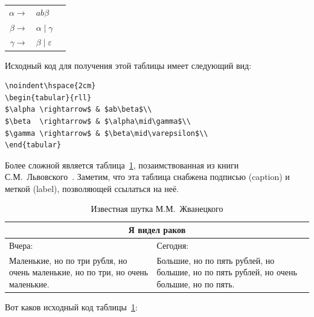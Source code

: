 \medskip
\noindent\hspace{2cm}
\begin{tabular}{rll}
$\alpha \rightarrow$ & $ab\beta$\\
$\beta  \rightarrow$ & $\alpha\mid\gamma$\\
$\gamma \rightarrow$ & $\beta\mid\varepsilon$\\
\end{tabular}
\medskip

\noindent Исходный код для получения этой таблицы имеет следующий вид:

\begin{small}
\begin{verbatim}
\noindent\hspace{2cm}
\begin{tabular}{rll}
$\alpha \rightarrow$ & $ab\beta$\\
$\beta  \rightarrow$ & $\alpha\mid\gamma$\\
$\gamma \rightarrow$ & $\beta\mid\varepsilon$\\
\end{tabular}
\end{verbatim}
\end{small}

Более сложной является таблица~\ref{tabl:crayfish}, позаимствованная из книги
С.\+М.~Львовского~\cite{rlatex}. Заметим, что эта таблица снабжена
подписью (caption) и меткой (label), позволяющей ссылаться на неё.

\begin{table}[ht!]
\begin{center}
\begin{tabular}{|p{5cm}|p{5cm}|}
\hline
\multicolumn{2}{|c|}{\large\textbf{Я видел раков}}\\
\hline
Вчера: & Сегодня: \\
\hline
Маленькие, но по три рубля, но очень
маленькие, но по три, но очень маленькие.
&
Большие, но по пять рублей, но большие, но
по пять рублей, но очень большие,
но по пять.\\
\hline
\end{tabular}
\end{center}
\caption{Известная шутка М.\+М.~Жванецкого}\label{tabl:crayfish}
\end{table}

\noindent 
Вот каков исходный код таблицы~\ref{tabl:crayfish}:

